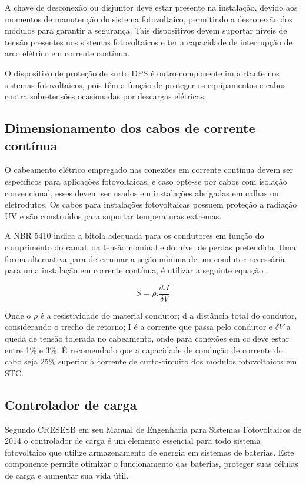 	A chave de desconexão ou disjuntor deve estar presente na instalação, devido aos momentos de manutenção do sistema fotovoltaico, permitindo a desconexão dos módulos para garantir a segurança. Tais dispositivos devem suportar níveis de tensão presentes nos sistemas fotovoltaicos e ter a capacidade de interrupção de arco elétrico em corrente contínua. 
	
	O dispositivo de proteção de surto DPS é outro componente importante nos sistemas fotovoltaicos, pois têm a função de proteger os equipamentos e cabos contra sobretensões ocasionadas por descargas elétricas.
	
	
\subsection{Dimensionamento dos cabos de corrente contínua} 

	O cabeamento elétrico empregado nas conexões em corrente contínua devem ser específicos para aplicações fotovoltaicas, e caso opte-se por cabos com isolação convencional, esses devem ser usados em instalações abrigadas em calhas ou eletrodutos. Os cabos para instalações fotovoltaicas possuem proteção a radiação UV e são construídos para suportar temperaturas extremas.
	
	A NBR 5410 indica a bitola adequada para os condutores em função do comprimento do ramal, da tensão nominal e do nível de perdas pretendido. Uma forma alternativa para determinar a seção mínima de um condutor necessária para uma instalação em corrente contínua, é utilizar a seguinte equação \cite{Cresesb}.

\begin{equation}
S  = \rho . \dfrac{d . I}{\delta V} 
\end{equation}

Onde o $\rho$ é a resistividade do material condutor; d a distância total do condutor, considerando o trecho de retorno; I é a corrente que passa pelo condutor e $\delta V$ a queda de tensão tolerada no cabeamento, onde para conexões em cc deve estar entre 1\% e 3\%. É recomendado que a capacidade de condução de corrente do cabo seja 25\% superior à corrente de curto-circuito dos módulos fotovoltaicos em STC.
	
\subsection{Controlador de carga} 

	Segundo CRESESB em seu Manual de Engenharia para Sistemas Fotovoltaicos de 2014 o controlador de carga é um elemento essencial para todo sistema fotovoltaico que utilize armazenamento de energia em sistemas de baterias. Este componente permite otimizar o funcionamento das baterias, proteger suas células de carga e aumentar sua vida útil. 
	
